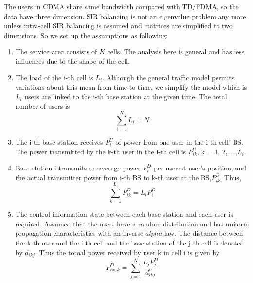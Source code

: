\documentclass[conference]{IEEEtran}
\begin{document}
The users in CDMA share same bandwidth compared with TD/FDMA, so the data have three dimension. SIR balancing is not an eigenvalue problem any more unless intra-cell SIR balancing is assumed and  matrices are simplified to two dimensions\cite{nettleton1983power}. So we set up the assumptions as following:              
\vspace*{3mm}
\begin{enumerate}
	\item The service area consists of $K$ cells. The analysis here is general and has less influences due to the shape of the cell.
	\item The load of the i-th cell is $L_{i}$. Although the general traffic model permits variations about this mean from time to time, we simplify the model which is $L_{i}$ users are linked to the i-th base station at the given time.
	The total number of users is  
	\begin{equation}
		\sum_{i=1}^{K} L_i = N
	\end{equation}
	\item The i-th base station receives $P^{U}_{i}$ of power from one user in the i-th cell' BS. The power transmitted by the k-th user in the i-th cell is $P^{U}_{ik}$, k = 1, 2, ...,$L_{i}$. 
	\item Base station i transmits an average power $P^{D}_{i}$ per user at user's position, and the actual transmitter power from i-th BS to k-th user at the BS,$P^{D}_{ik}$. Thus,
	\begin{equation}
	\sum_{k=1}^{L_i} P^{D}_{ik} = L_iP_i^D
	\end{equation}
	\item The control information state between each base station and each user is required. Assumed that the users have a random distribution and has uniform propagation characteristics with an inverse-$alpha$ law. The distance between the k-th user and the i-th cell and the base station of the j-th cell is denoted by $d_{ikj}$. Thus the totoal power received by user k in cell i is given by
	\begin{equation}
	 P_{rx,k}^D = \sum^N_{j=1} \frac{L_jP_j^D}{d^\alpha_{ikj}}
	\end{equation}
\end{enumerate}
\end{document}
